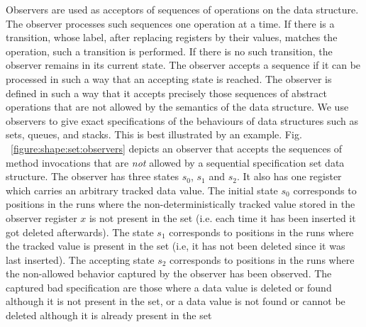Observers are used as
acceptors of sequences of operations on the data structure. The observer processes such sequences
one operation at a time. If there is a transition, whose label, after replacing registers by their values, matches the operation, such a transition is performed. If there is no such transition,
the observer remains in its current state. The observer accepts a sequence if it can be
processed in such a way that an accepting state is reached. The observer is defined in such a way that it accepts
precisely those sequences of abstract operations that are not allowed by the semantics of
the data structure. We use observers to give exact specifications of the behaviours of data structures such as sets, queues, and stacks. This is best illustrated by an example. Fig. ~\ref{figure:shape:set:observers} depicts an observer that
accepts the sequences of method invocations that are \emph{not} allowed by a sequential specification set data structure. The observer has three states $s_0$, $s_1$ and $s_2$. It also has one register which carries an arbitrary tracked data value. The initial state $s_0$ corresponds to positions in the runs where the non-deterministically tracked value
stored in the observer register $x$ is not present in the set (i.e.
each time it has been inserted it got deleted afterwards). The
state $s_1$ corresponds to positions in the runs where the tracked
value is present in the set (i.e, it has not been deleted since it
was last inserted). The accepting state $s_2$ corresponds to positions
in the runs where the non-allowed behavior captured by the observer has been observed. The captured bad specification are those where
a data value is deleted or found although it is not present in the set, or a data value is not found or cannot be deleted although it is already present in the set

